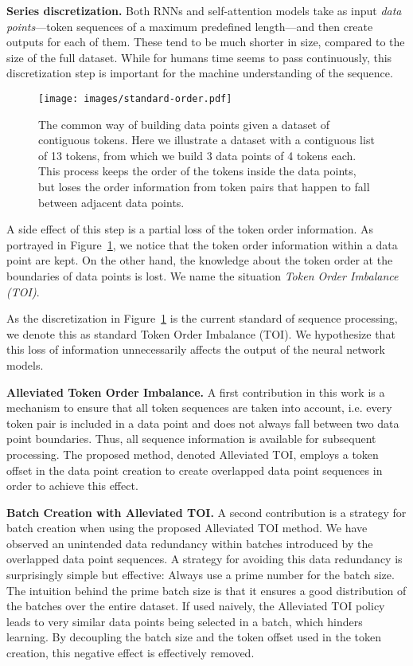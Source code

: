 \documentclass[11pt,a4paper]{article}
\begin{document}
\textbf{Series discretization.} 
Both RNNs and self-attention models take as input \textit{data points}---token sequences of a maximum predefined length---and then create outputs for each of them. These tend to be much shorter in size, compared to the size of the full dataset. 
While for humans time seems to pass continuously, this discretization step is important for the machine understanding of the sequence.

\begin{figure}
    \centering
    \texttt{[image: images/standard-order.pdf]}
    \caption{The common way of building data points given a dataset of contiguous tokens. Here we illustrate a dataset with  a contiguous list of 13 tokens, from which we build 3 data points of 4 tokens each. This process keeps the order of the tokens inside the data points, but loses the order information from token pairs that happen to fall between adjacent data points.}
    \label{fig:standard order}
\end{figure}

A side effect of this step is a partial loss of the token order information. As portrayed in Figure~\ref{fig:standard order}, we notice that the token order information within a data point are kept. On the other hand, the knowledge about the token order at the boundaries of data points is lost. We name the situation \textit{Token Order Imbalance (TOI)}. 

As the discretization in Figure~\ref{fig:standard order} is the current standard of sequence processing, we denote this as standard Token Order Imbalance (TOI).
We hypothesize that this loss of information unnecessarily affects the output of the neural network models.

\textbf{Alleviated Token Order Imbalance.}
A first contribution in this work is a mechanism to ensure that all token sequences are taken into account, i.e. every token pair is included in a data point and does not always fall between two data point boundaries. Thus, all sequence information is available for subsequent processing. The proposed method, denoted Alleviated TOI, employs a token offset in the data point creation to create overlapped data point sequences in order to achieve this effect.

\textbf{Batch Creation with Alleviated TOI.}
A second contribution is a strategy for batch creation when using the proposed Alleviated TOI method. We have observed an unintended data redundancy within batches introduced by the overlapped data point sequences. A strategy for avoiding this data redundancy is surprisingly simple but effective: Always use a prime number for the batch size. The intuition behind the prime batch size is that it ensures a good distribution of the batches over the entire dataset. If used naively, the Alleviated TOI policy leads to very similar data points being selected in a batch, which hinders learning. By decoupling the batch size and the token offset used in the token creation, this negative effect is effectively removed.
\end{document}
